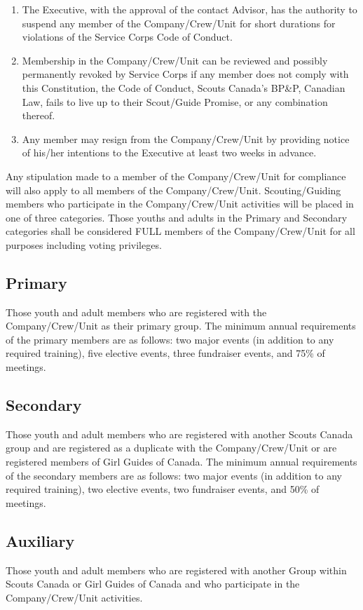 \documentclass{Service_Corps_Document}
\begin{document}
\begin{enumerate}
        \item The Executive, with the approval of the contact Advisor, has the authority to suspend any member of the Company/Crew/Unit for short durations for violations of the Service Corps Code of Conduct.
        \item Membership in the Company/Crew/Unit can be reviewed and possibly permanently revoked by Service Corps if any member does not comply with this Constitution, the Code of Conduct, Scouts Canada's BP\&P, Canadian Law, fails to live up to their Scout/Guide Promise, or any combination thereof.
        \item Any member may resign from the Company/Crew/Unit by providing notice of his/her intentions to the Executive at least two weeks in advance.
    \end{enumerate}
    Any stipulation made to a member of the Company/Crew/Unit for compliance will also apply to all members of the Company/Crew/Unit.
    Scouting/Guiding members who participate in the Company/Crew/Unit activities will be placed in one of three categories.
    Those youths and adults in the Primary and Secondary categories shall be considered FULL members of the Company/Crew/Unit for all purposes including voting privileges.

    \subsection{Primary}\label{subsec:primary}
    Those youth and adult members who are registered with the Company/Crew/Unit as their primary group.
    The minimum annual requirements of the primary members are as follows: two major events (in addition to any required training), five elective events, three fundraiser events, and 75\% of meetings.

    \subsection{Secondary}\label{subsec:secondary}
    Those youth and adult members who are registered with another Scouts Canada group and are registered as a duplicate with the Company/Crew/Unit or are registered members of Girl Guides of Canada.
    The minimum annual requirements of the secondary members are as follows: two major events (in addition to any required training), two elective events, two fundraiser events, and 50\% of meetings.

    \subsection{Auxiliary}\label{subsec:auxiliary}
    Those youth and adult members who are registered with another Group within Scouts Canada or Girl Guides of Canada and who participate in the Company/Crew/Unit activities.
\end{document}
